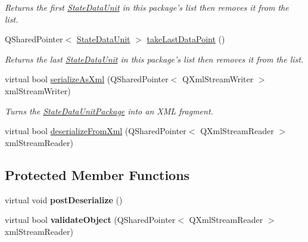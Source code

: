 \begin{DoxyCompactItemize}
\begin{DoxyCompactList}\small\item\em Returns the first \hyperlink{class_picto_1_1_state_data_unit}{State\-Data\-Unit} in this package's list then removes it from the list. \end{DoxyCompactList}\item 
\hypertarget{class_picto_1_1_state_data_unit_package_a57ba13dd0c3f19342f5efb39d59ea2ad}{Q\-Shared\-Pointer$<$ \hyperlink{class_picto_1_1_state_data_unit}{State\-Data\-Unit} $>$ \hyperlink{class_picto_1_1_state_data_unit_package_a57ba13dd0c3f19342f5efb39d59ea2ad}{take\-Last\-Data\-Point} ()}\label{class_picto_1_1_state_data_unit_package_a57ba13dd0c3f19342f5efb39d59ea2ad}

\begin{DoxyCompactList}\small\item\em Returns the last \hyperlink{class_picto_1_1_state_data_unit}{State\-Data\-Unit} in this package's list then removes it from the list. \end{DoxyCompactList}\item 
\hypertarget{class_picto_1_1_state_data_unit_package_acca3eb97bacb1de87e99a6f01787eb84}{virtual bool \hyperlink{class_picto_1_1_state_data_unit_package_acca3eb97bacb1de87e99a6f01787eb84}{serialize\-As\-Xml} (Q\-Shared\-Pointer$<$ Q\-Xml\-Stream\-Writer $>$ xml\-Stream\-Writer)}\label{class_picto_1_1_state_data_unit_package_acca3eb97bacb1de87e99a6f01787eb84}

\begin{DoxyCompactList}\small\item\em Turns the \hyperlink{class_picto_1_1_state_data_unit_package}{State\-Data\-Unit\-Package} into an X\-M\-L fragment. \end{DoxyCompactList}\item 
virtual bool \hyperlink{class_picto_1_1_state_data_unit_package_ab1dfa63f518b4a629b289b4ee66f2be5}{deserialize\-From\-Xml} (Q\-Shared\-Pointer$<$ Q\-Xml\-Stream\-Reader $>$ xml\-Stream\-Reader)
\end{DoxyCompactItemize}
\subsection*{Protected Member Functions}
\begin{DoxyCompactItemize}
\item 
\hypertarget{class_picto_1_1_state_data_unit_package_a30ad8e53d5b9e18b2147e7122e4d88ff}{virtual void {\bfseries post\-Deserialize} ()}\label{class_picto_1_1_state_data_unit_package_a30ad8e53d5b9e18b2147e7122e4d88ff}

\item 
\hypertarget{class_picto_1_1_state_data_unit_package_aeefa8e153a3a1623b7cb0e59f9c6b793}{virtual bool {\bfseries validate\-Object} (Q\-Shared\-Pointer$<$ Q\-Xml\-Stream\-Reader $>$ xml\-Stream\-Reader)}\label{class_picto_1_1_state_data_unit_package_aeefa8e153a3a1623b7cb0e59f9c6b793}

\end{DoxyCompactItemize}
